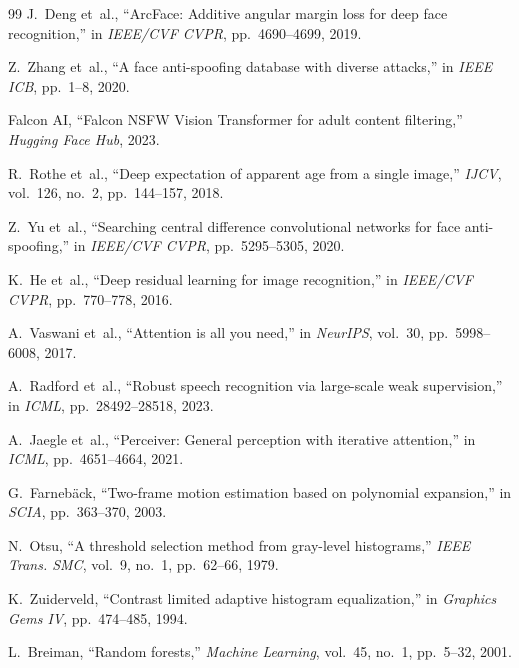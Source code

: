 \documentclass[12pt,a4paper]{report}
\begin{document}
\begin{thebibliography}{99}
J.~Deng et~al.,
\newblock ``ArcFace: Additive angular margin loss for deep face recognition,''
\newblock in \emph{IEEE/CVF CVPR}, pp.~4690--4699, 2019.

Z.~Zhang et~al.,
\newblock ``A face anti-spoofing database with diverse attacks,''
\newblock in \emph{IEEE ICB}, pp.~1--8, 2020.

Falcon AI,
\newblock ``Falcon NSFW Vision Transformer for adult content filtering,''
\newblock \emph{Hugging Face Hub}, 2023.

R.~Rothe et~al.,
\newblock ``Deep expectation of apparent age from a single image,''
\newblock \emph{IJCV}, vol.~126, no.~2, pp.~144--157, 2018.

Z.~Yu et~al.,
\newblock ``Searching central difference convolutional networks for face anti-spoofing,''
\newblock in \emph{IEEE/CVF CVPR}, pp.~5295--5305, 2020.

K.~He et~al.,
\newblock ``Deep residual learning for image recognition,''
\newblock in \emph{IEEE/CVF CVPR}, pp.~770--778, 2016.

A.~Vaswani et~al.,
\newblock ``Attention is all you need,''
\newblock in \emph{NeurIPS}, vol.~30, pp.~5998--6008, 2017.

A.~Radford et~al.,
\newblock ``Robust speech recognition via large-scale weak supervision,''
\newblock in \emph{ICML}, pp.~28492--28518, 2023.

A.~Jaegle et~al.,
\newblock ``Perceiver: General perception with iterative attention,''
\newblock in \emph{ICML}, pp.~4651--4664, 2021.

G.~Farneb{\"a}ck,
\newblock ``Two-frame motion estimation based on polynomial expansion,''
\newblock in \emph{SCIA}, pp.~363--370, 2003.

N.~Otsu,
\newblock ``A threshold selection method from gray-level histograms,''
\newblock \emph{IEEE Trans. SMC}, vol.~9, no.~1, pp.~62--66, 1979.

K.~Zuiderveld,
\newblock ``Contrast limited adaptive histogram equalization,''
\newblock in \emph{Graphics Gems IV}, pp.~474--485, 1994.

L.~Breiman,
\newblock ``Random forests,''
\newblock \emph{Machine Learning}, vol.~45, no.~1, pp.~5--32, 2001.


\end{thebibliography}
\end{document}
